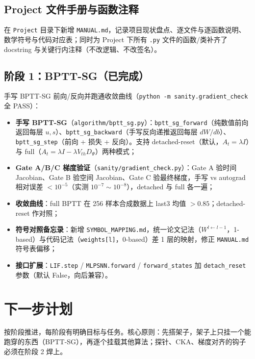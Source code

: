 \documentclass[journal,12pt,onecolumn]{IEEEtran}
\begin{document}
\subsection{Project 文件手册与函数注释}

在 \texttt{Project} 目录下新增 \texttt{MANUAL.md}，记录项目现状盘点、逐文件与逐函数说明、数学符号与代码对应表；同时为 Project 下所有 \texttt{.py} 文件的函数/类补齐了 docstring 与关键行内注释（不改逻辑、不改签名）。

\subsection{阶段 1：BPTT-SG（已完成）}

手写 BPTT-SG 前向/反向并跑通收敛曲线（\texttt{python -m sanity.gradient\_check} 全 PASS）：

\begin{itemize}[leftmargin=1.5em,itemsep=2pt]
\item \textbf{手写 BPTT-SG}（\texttt{algorithm/bptt\_sg.py}）：\texttt{bptt\_sg\_forward}（纯数值前向返回每层 $u,s$）、\texttt{bptt\_sg\_backward}（手写反向递推返回每层 $dW/db$）、\texttt{bptt\_sg\_step}（前向 + 损失 + 反向）。支持 detached-reset（默认，$A_t=\lambda I$）与 full（$A_t=\lambda I-\lambda V_{th}D_\Psi$）两种模式；
\item \textbf{Gate A/B/C 梯度验证}（\texttt{sanity/gradient\_check.py}）：Gate A 验时间 Jacobian、Gate B 验空间 Jacobian、Gate C 验最终梯度，手写 vs autograd 相对误差 $<10^{-5}$（实测 $10^{-7}\sim10^{-8}$），detached 与 full 各一遍；
\item \textbf{收敛曲线}：full BPTT 在 256 样本合成数据上 last3 均值 $>0.85$；detached-reset 作对照；
\item \textbf{符号对照备忘录}：新增 \texttt{SYMBOL\_MAPPING.md}，统一论文记法（$W^{l\leftarrow l-1}$，1-based）与代码记法（\texttt{weights[l]}，0-based）差 1 层的映射，修正 \texttt{MANUAL.md} 符号表偏移；
\item \textbf{接口扩展}：\texttt{LIF.step} / \texttt{MLPSNN.forward} / \texttt{forward\_states} 加 \texttt{detach\_reset} 参数（默认 False，向后兼容）。
\end{itemize}

\section{下一步计划}

按阶段推进，每阶段有明确目标与任务。核心原则：先搭架子，架子上只挂一个能跑穿的东西（BPTT-SG），再逐个挂载其他算法；探针、CKA、梯度对齐的钩子必须在阶段 2 焊上。
\end{document}
